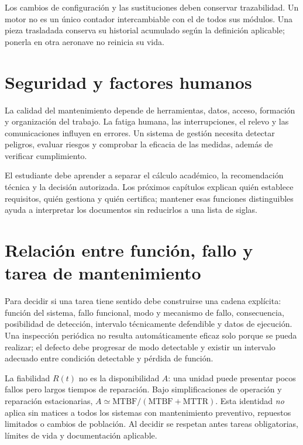 Los cambios de configuración y las sustituciones deben conservar trazabilidad. Un motor no es un único contador intercambiable con el de todos sus módulos. Una pieza trasladada conserva su historial acumulado según la definición aplicable; ponerla en otra aeronave no reinicia su vida.
\section{Seguridad y factores humanos}
La calidad del mantenimiento depende de herramientas, datos, acceso, formación y organización del trabajo. La fatiga humana, las interrupciones, el relevo y las comunicaciones influyen en errores. Un sistema de gestión necesita detectar peligros, evaluar riesgos y comprobar la eficacia de las medidas, además de verificar cumplimiento.

El estudiante debe aprender a separar el cálculo académico, la recomendación técnica y la decisión autorizada. Los próximos capítulos explican quién establece requisitos, quién gestiona y quién certifica; mantener esas funciones distinguibles ayuda a interpretar los documentos sin reducirlos a una lista de siglas.
\section{Relación entre función, fallo y tarea de mantenimiento}
Para decidir si una tarea tiene sentido debe construirse una cadena explícita: función del sistema, fallo funcional, modo y mecanismo de fallo, consecuencia, posibilidad de detección, intervalo técnicamente defendible y datos de ejecución. Una inspección periódica no resulta automáticamente eficaz solo porque se pueda realizar; el defecto debe progresar de modo detectable y existir un intervalo adecuado entre condición detectable y pérdida de función.

La fiabilidad $R(t)$ no es la disponibilidad $A$: una unidad puede presentar pocos fallos pero largos tiempos de reparación. Bajo simplificaciones de operación y reparación estacionarias, $A\simeq\mathrm{MTBF}/(\mathrm{MTBF}+\mathrm{MTTR})$. Esta identidad \emph{no} aplica sin matices a todos los sistemas con mantenimiento preventivo, repuestos limitados o cambios de población. Al decidir se respetan antes tareas obligatorias, límites de vida y documentación aplicable.



